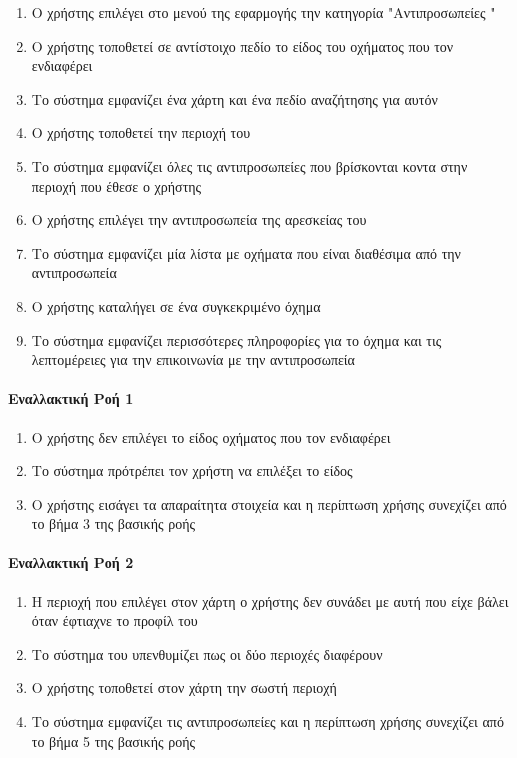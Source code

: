 \documentclass{../ol-softwaremanual}
\begin{document}
    \begin{enumerate}
    	\item Ο χρήστης επιλέγει στο μενού της εφαρμογής την κατηγορία \en"\gr Αντιπροσωπείες \en"\gr
    	\item Ο χρήστης τοποθετεί σε αντίστοιχο πεδίο το είδος του οχήματος που τον ενδιαφέρει
    	\item Το σύστημα εμφανίζει ένα χάρτη και ένα πεδίο αναζήτησης για αυτόν
    	\item Ο χρήστης τοποθετεί την περιοχή του  
    	\item Το σύστημα εμφανίζει όλες τις αντιπροσωπείες που βρίσκονται κοντα στην περιοχή που έθεσε ο χρήστης
    	\item Ο χρήστης επιλέγει την αντιπροσωπεία της αρεσκείας του
    	\item Το σύστημα εμφανίζει μία λίστα με οχήματα που είναι διαθέσιμα από την αντιπροσωπεία 
    	\item Ο χρήστης καταλήγει σε ένα συγκεκριμένο όχημα
    	\item Το σύστημα εμφανίζει περισσότερες πληροφορίες για το όχημα και τις λεπτομέρειες για την επικοινωνία με την αντιπροσωπεία
    	
    \end{enumerate}
    
    \paragraph{Εναλλακτική Ροή 1}
    
    \begin{enumerate}
    	\item Ο χρήστης δεν επιλέγει το είδος οχήματος που τον ενδιαφέρει
    	\item Το σύστημα πρότρέπει τον χρήστη να επιλέξει το είδος
    	\item Ο χρήστης εισάγει τα απαραίτητα στοιχεία και η περίπτωση χρήσης συνεχίζει από το βήμα 3 της βασικής ροής
    \end{enumerate}

    \paragraph{Εναλλακτική Ροή 2}
    
    \begin{enumerate}
    	\item Η περιοχή που επιλέγει στον χάρτη ο χρήστης δεν συνάδει με αυτή που είχε βάλει όταν έφτιαχνε το προφίλ του
    	\item Το σύστημα του υπενθυμίζει πως οι δύο περιοχές διαφέρουν
    	\item Ο χρήστης τοποθετεί στον χάρτη την σωστή περιοχή
    	\item  Το σύστημα εμφανίζει τις αντιπροσωπείες και η περίπτωση χρήσης συνεχίζει από το βήμα 5 της βασικής ροής
    \end{enumerate}
\end{document}
